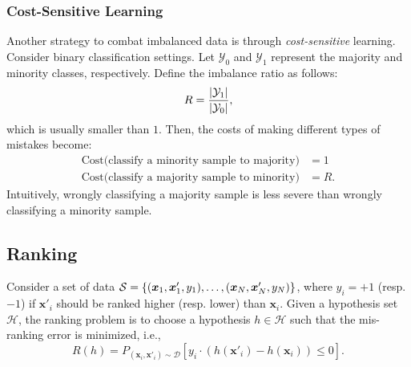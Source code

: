     \subsubsection{Cost-Sensitive Learning}
        Another strategy to combat imbalanced data is through \emph{cost-sensitive} learning.
        Consider binary classification settings.
        Let $\mathcal{Y}_0$ and $\mathcal{Y}_1$ represent the majority and minority classes, respectively. 
        Define the imbalance ratio as follows:
            \begin{equation}
                R = \frac{| \mathcal{Y}_1 |}{| \mathcal{Y}_0 |},
            \end{equation}
        which is usually smaller than $1$. 
        Then, the costs of making different types of mistakes become:
            \begin{equation}
                \begin{aligned}
                        \text{Cost(classify a minority sample to majority)} & = 1 \\
                        \text{Cost(classify a majority sample to minority)} & = R.
                \end{aligned}
            \end{equation}
        Intuitively, wrongly classifying a majority sample is less severe than wrongly classifying a minority sample.
        

\subsection{Ranking}
    Consider a set of data $\mathcal{S}=\{ (\bm{x}_1, \bm{x}'_1, y_1), \ldots, (\bm{x}_{N}, \bm{x}'_{N}, y_{N}) \}$, where $y_i=+1$ (resp. $-1$) if $\bm{x}'_i$ should be ranked higher (resp. lower) than $\bm{x}_i$.
    Given a hypothesis set $\mathcal{H}$, the ranking problem is to choose a hypothesis $h \in \mathcal{H}$ such that the mis-ranking error is minimized, i.e.,
        \begin{equation}
            R(h) = P_{(\bm{x}_i, \bm{x}'_i) \sim \mathcal{D}}\left[ y_i \cdot \left( h(\bm{x}'_i) - h(\bm{x}_i) \right) \le 0 \right].
        \end{equation}
    
